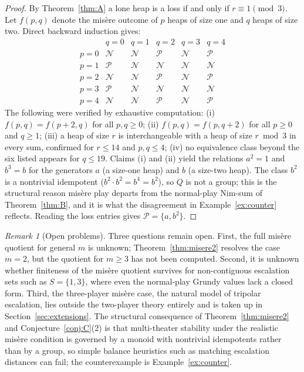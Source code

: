 \documentclass[11pt]{article}
\theoremstyle{plain}
\theoremstyle{definition}
\theoremstyle{remark}
\newtheorem{remark}[theorem]{Remark}
\begin{document}
\begin{proof}
By Theorem~\ref{thm:A} a lone heap is a loss if and only if $r\equiv
1\pmod 3$. Let $f(p,q)$ denote the mis\`ere outcome of $p$ heaps of size one
and $q$ heaps of size two. Direct backward induction gives:
\[
\begin{array}{c|ccccc}
 & q=0 & q=1 & q=2 & q=3 & q=4\\\hline
p=0 & \mathcal{N} & \mathcal{N} & \mathcal{P} & \mathcal{N} & \mathcal{P}\\
p=1 & \mathcal{P} & \mathcal{N} & \mathcal{N} & \mathcal{N} & \mathcal{N}\\
p=2 & \mathcal{N} & \mathcal{N} & \mathcal{P} & \mathcal{N} & \mathcal{P}\\
p=3 & \mathcal{P} & \mathcal{N} & \mathcal{N} & \mathcal{N} & \mathcal{N}\\
p=4 & \mathcal{N} & \mathcal{N} & \mathcal{P} & \mathcal{N} & \mathcal{P}
\end{array}
\]
The following were verified by exhaustive computation: (i) $f(p,q)=f(p+2,q)$
for all $p,q\ge 0$; (ii) $f(p,q)=f(p,q+2)$ for all $p\ge 0$ and $q\ge 1$;
(iii) a heap of size $r$ is interchangeable with a heap of size $r\bmod 3$ in
every sum, confirmed for $r\le 14$ and $p,q\le 4$; (iv) no equivalence class
beyond the six listed appears for $q\le 19$. Claims (i) and (ii) yield the
relations $a^2=1$ and $b^3=b$ for the generators $a$ (a size-one heap) and
$b$ (a size-two heap). The class $b^2$ is a nontrivial idempotent
($b^2\cdot b^2=b^4=b^2$), so $Q$ is not a group; this is the structural
reason mis\`ere play departs from the normal-play Nim-sum of
Theorem~\ref{thm:B}, and it is what the disagreement in
Example~\ref{ex:counter} reflects. Reading the loss entries gives
$\mathcal{P}=\{a,b^2\}$.
\end{proof}

\begin{remark}[Open problems]\label{rem:open}
Three questions remain open. First, the full mis\`ere quotient for general $m$
is unknown; Theorem~\ref{thm:misere2} resolves the case $m=2$, but the
quotient for $m\ge 3$ has not been computed. Second, it is unknown whether
finiteness of the mis\`ere quotient survives for non-contiguous escalation
sets such as $S=\{1,3\}$, where even the normal-play Grundy values lack a
closed form. Third, the three-player mis\`ere case, the natural model of
tripolar escalation, lies outside the two-player theory entirely and is taken
up in Section~\ref{sec:extensions}. The structural consequence of
Theorem~\ref{thm:misere2} and Conjecture~\ref{conj:C}(2) is that
multi-theater stability under the realistic mis\`ere condition is governed by
a monoid with nontrivial idempotents rather than by a group, so simple
balance heuristics such as matching escalation distances can fail; the
counterexample is Example~\ref{ex:counter}.
\end{remark}
\end{document}
